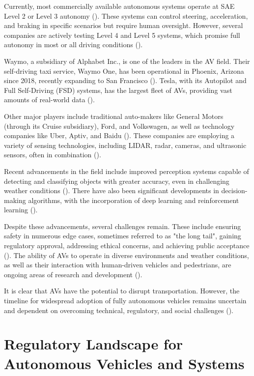 Currently, most commercially available autonomous systems operate at SAE Level 2 or Level 3 autonomy (\cite{SAE2021}). These systems can control steering, acceleration, and braking in specific scenarios but require human oversight. However, several companies are actively testing Level 4 and Level 5 systems, which promise full autonomy in most or all driving conditions (\cite{Yurtsever2020}).

Waymo, a subsidiary of Alphabet Inc., is one of the leaders in the AV field. Their self-driving taxi service, Waymo One, has been operational in Phoenix, Arizona since 2018, recently expanding to San Francisco (\cite{Waymo2023}). Tesla, with its Autopilot and Full Self-Driving (FSD) systems, has the largest fleet of AVs, providing vast amounts of real-world data (\cite{Tesla2023}).

Other major players include traditional auto-makers like General Motors (through its Cruise subsidiary), Ford, and Volkswagen, as well as technology companies like Uber, Aptiv, and Baidu (\cite{Koopman2019}). These companies are employing a variety of sensing technologies, including LIDAR, radar, cameras, and ultrasonic sensors, often in combination (\cite{Yurtsever2020}).

Recent advancements in the field include improved perception systems capable of detecting and classifying objects with greater accuracy, even in challenging weather conditions (\cite{Grigorescu2020}). There have also been significant developments in decision-making algorithms, with the incorporation of deep learning and reinforcement learning (\cite{Kiran2021}).

Despite these advancements, several challenges remain. These include ensuring safety in numerous edge cases, sometimes referred to as "the long tail", gaining regulatory approval, addressing ethical concerns, and achieving public acceptance (\cite{Koopman2019}). The ability of AVs to operate in diverse environments and weather conditions, as well as their interaction with human-driven vehicles and pedestrians, are ongoing areas of research and development (\cite{Yurtsever2020}).

It is clear that AVs have the potential to disrupt transportation. However, the timeline for widespread adoption of fully autonomous vehicles remains uncertain and dependent on overcoming technical, regulatory, and social challenges (\cite{Litman2023}).

\section{Regulatory Landscape for Autonomous Vehicles and Systems}

